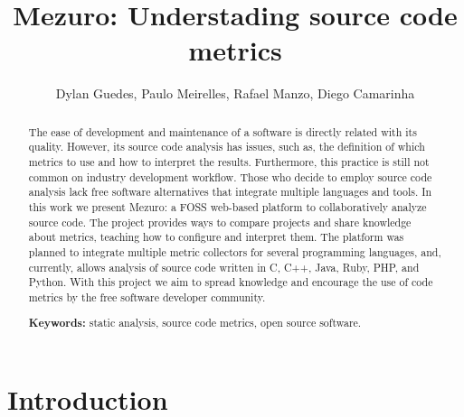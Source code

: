 \documentclass{llncs}
\begin{document}
\sloppy
\title{Mezuro: Understading source code metrics} %

\author{Dylan Guedes, Paulo Meirelles,
        Rafael Manzo, Diego Camarinha}



\maketitle
\begin{abstract}
  The ease of development and maintenance of a software is directly related
with its quality.
  However, its source code analysis has issues, such as, the definition of
which metrics to use and how to interpret the results. Furthermore, this
practice is still not common on industry development workflow. Those who %
decide to employ source code analysis lack free software alternatives that
integrate multiple languages and tools.
  In this work we present Mezuro: a FOSS web-based platform to collaboratively
analyze source code. The project provides ways to compare projects and share
knowledge about metrics, teaching how to configure and interpret them. The
platform was planned to integrate multiple metric collectors for several
programming languages, and, currently, allows analysis of source code written
in C, C++, Java, Ruby, PHP, and Python.
  With this project we aim to spread knowledge and encourage the use of %
code metrics by the free software developer community.

\textbf{Keywords:} static analysis, source code metrics, open source software.
\end{abstract}

\section{Introduction}
\label{sec:intro}
\end{document}
